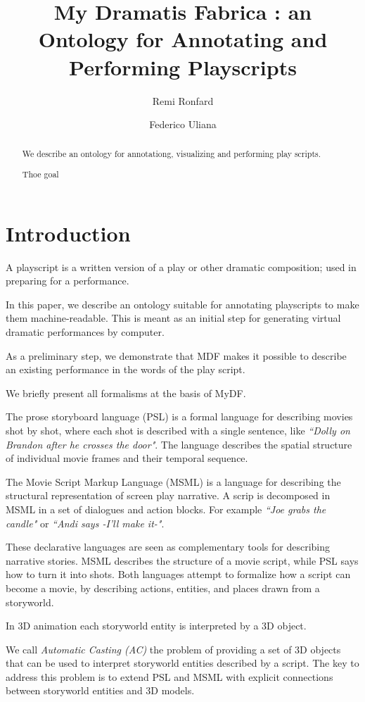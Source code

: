 \documentclass[a4paper,UKenglish]{oasics}
\title{My Dramatis Fabrica : an Ontology for Annotating and Performing Playscripts}
\author[1]{Remi Ronfard}
\author[2]{Federico Uliana}
\affil[1]{Inria, LJK, University of Grenoble, France\\
  \texttt{remi.ronfard@inria.fr}}
\affil[2]{Inria, LIRMM, University of Montpellier, France\\
  \texttt{federico.uliana@inria.fr}}
\newcommand{\mydf}{MyDF}
\begin{document}
\maketitle

\begin{abstract}
We describe an ontology for annotationg, visualizing and performing play scripts. 

Thoe goal 
 \end{abstract}

\section{Introduction}

A playscript is a written version of a play or other dramatic composition; used in preparing for a performance.

In this paper, we describe an ontology suitable for annotating playscripts to make them machine-readable.
This is meant as an initial step for generating virtual dramatic performances by computer.

As a preliminary step, we demonstrate that MDF makes it possible to describe an existing performance
in the words of the play script.

We briefly present all formalisms at the basis of \mydf.

\smallskip
The prose storyboard language (PSL) is a formal language for describing movies shot by shot, where each shot is described with a single sentence, like \emph{``Dolly on Brandon after he crosses the door"}.
The language describes the spatial structure of individual movie frames and their temporal sequence.

\smallskip
The Movie Script Markup Language (MSML) is a language for describing the structural representation of screen play narrative. A scrip is decomposed in MSML in a set of dialogues and action blocks. For example \emph{``Joe grabs the candle"} or \emph{``Andi says -\emph{I'll make it}-"}. 

\smallskip
These declarative languages are seen as complementary tools for describing narrative stories. MSML describes the structure of a movie script, while PSL says how to turn it into shots.
Both languages attempt to formalize how a script can become a movie, by describing actions, entities, and places drawn from a storyworld.

\smallskip
In 3D animation each storyworld entity is interpreted by a 3D object. 

We call \emph{Automatic Casting (AC)} the problem of providing a set of 3D objects that can be used to interpret storyworld entities described by a script. 
The key to address this problem is to extend PSL and MSML with explicit connections between storyworld entities and 3D models. 
\end{document}
